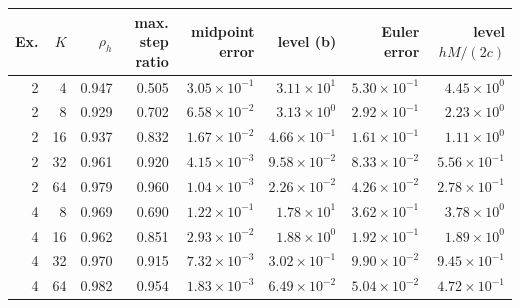 \begin{tabular}{rrrrrrrr}
\toprule
Ex. & $K$ & $\rho_h$ & max. step ratio & midpoint error & level (b) & Euler error & level $hM/(2c)$\\
\midrule
2 & 4 & 0.947 & 0.505 & $3.05\times10^{-1}$ & $3.11\times10^{1}$ & $5.30\times10^{-1}$ & $4.45\times10^{0}$\\
2 & 8 & 0.929 & 0.702 & $6.58\times10^{-2}$ & $3.13\times10^{0}$ & $2.92\times10^{-1}$ & $2.23\times10^{0}$\\
2 & 16 & 0.937 & 0.832 & $1.67\times10^{-2}$ & $4.66\times10^{-1}$ & $1.61\times10^{-1}$ & $1.11\times10^{0}$\\
2 & 32 & 0.961 & 0.920 & $4.15\times10^{-3}$ & $9.58\times10^{-2}$ & $8.33\times10^{-2}$ & $5.56\times10^{-1}$\\
2 & 64 & 0.979 & 0.960 & $1.04\times10^{-3}$ & $2.26\times10^{-2}$ & $4.26\times10^{-2}$ & $2.78\times10^{-1}$\\
4 & 8 & 0.969 & 0.690 & $1.22\times10^{-1}$ & $1.78\times10^{1}$ & $3.62\times10^{-1}$ & $3.78\times10^{0}$\\
4 & 16 & 0.962 & 0.851 & $2.93\times10^{-2}$ & $1.88\times10^{0}$ & $1.92\times10^{-1}$ & $1.89\times10^{0}$\\
4 & 32 & 0.970 & 0.915 & $7.32\times10^{-3}$ & $3.02\times10^{-1}$ & $9.90\times10^{-2}$ & $9.45\times10^{-1}$\\
4 & 64 & 0.982 & 0.954 & $1.83\times10^{-3}$ & $6.49\times10^{-2}$ & $5.04\times10^{-2}$ & $4.72\times10^{-1}$\\
\bottomrule
\end{tabular}